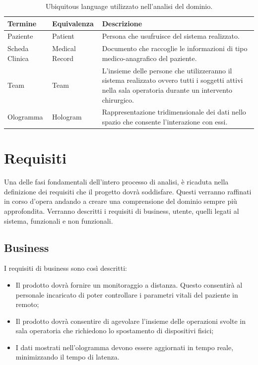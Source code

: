\bgroup
\def\arraystretch{1.5}
\begin{table}[H]
    \begin{tabular}{ |m{2.5cm}|m{2.5cm}|m{7cm}| } 
        \hline
        \textbf{Termine} & \textbf{Equivalenza} & \textbf{Descrizione}
        \\\hline
        Paziente & Patient & Persona che usufruisce del sistema realizzato.
        \\\hline
        Scheda Clinica & Medical Record & Documento che raccoglie le informazioni di tipo medico-anagrafico del paziente. 
        \\\hline
        Team & Team & L'insieme delle persone che utilizzeranno il sistema realizzato ovvero tutti i soggetti attivi nella sala operatoria durante un intervento chirurgico.
        \\\hline
        Ologramma & Hologram  & Rappresentazione tridimensionale dei dati nello spazio che consente l'interazione con essi.
        \\\hline
    \end{tabular}
    \caption{\label{tab:mixed-reality-ubiquitous-language-table}Ubiquitous language utilizzato nell'analisi del dominio.}
\end{table}
\egroup


\section{Requisiti}
Una delle fasi fondamentali dell’intero processo di analisi, è ricaduta nella definizione dei requisiti che il progetto dovrà soddisfare. Questi verranno raffinati in corso d’opera andando a creare una comprensione del dominio sempre più approfondita. Verranno descritti i requisiti di business, utente, quelli legati al sistema, funzionali e non funzionali.

\subsection{Business}
I requisiti di business sono così descritti:

\begin{itemize}
    \item Il prodotto dovrà fornire un monitoraggio a distanza. Questo consentirà al personale incaricato di poter controllare i parametri vitali del paziente in remoto;
    
    \item Il prodotto dovrà consentire di agevolare l'insieme delle operazioni svolte in sala operatoria che richiedono lo spostamento di dispositivi fisici;
    
    \item I dati mostrati nell'ologramma devono essere aggiornati in tempo reale, minimizzando il tempo di latenza.
\end{itemize}

